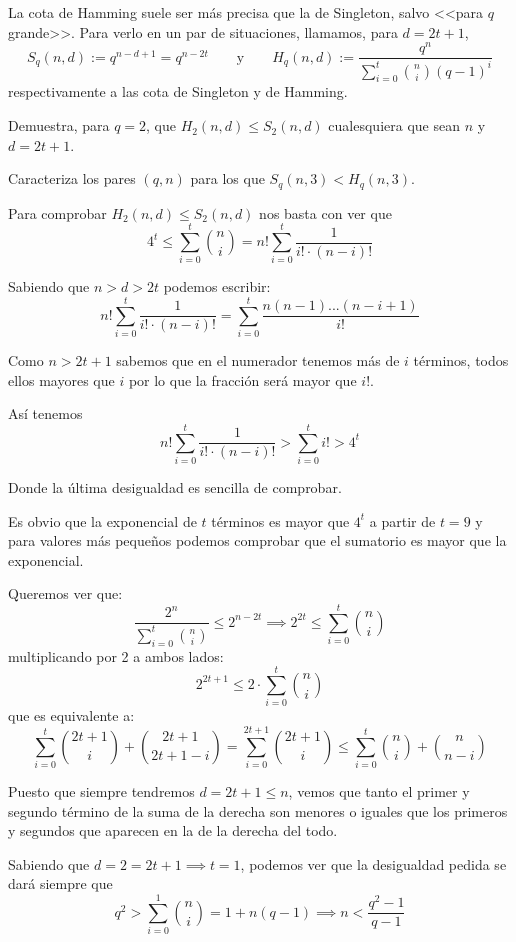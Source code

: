 \begin{problem}[10] La cota de Hamming suele ser más precisa que la de Singleton, salvo <<para $q$ grande>>. Para verlo en un par de situaciones, llamamos, para $d=2t+1$, $$S_q(n,d):=q^{n-d+1}=q^{n-2t}\qquad \text{y} \qquad H_q(n,d):=\frac{q^n}{\sum_{i=0}^t \binom{n}{i}(q-1)^i}$$ respectivamente a las cota de Singleton y de Hamming.

\ppart Demuestra, para $q=2$, que $H_2(n,d)\le S_2(n,d)$ cualesquiera que sean $n$ y $d=2t+1$.


\ppart Caracteriza los pares $(q,n)$ para los que $S_q(n,3)<H_q(n,3)$.

\solution


\spart

Para comprobar $H_2(n,d) \leq S_2(n,d)$ nos basta con ver que
\[4^{t} \leq \sum_{i=0}^t \binom{n}{i} = n! \sum_{i=0}^t\frac{1}{i!\cdot (n-i)!}\]

Sabiendo que $n>d > 2t$ podemos escribir:
\[ n! \sum_{i=0}^t\frac{1}{i!\cdot (n-i)!} =\sum_{i=0}^t\frac{n(n-1)...(n-i+1)}{i!}\]

Como $n>2t+1$ sabemos que en el numerador tenemos más de $i$ términos, todos ellos mayores que $i$ por lo que la fracción será mayor que $i!$.

Así tenemos
\[n! \sum_{i=0}^t\frac{1}{i!\cdot (n-i)!} > \sum_{i=0}^t i! > 4^t\]

Donde la última desigualdad es sencilla de comprobar.

Es obvio que la exponencial de $t$ términos es mayor que $4^t$ a partir de $t=9$ y para valores más pequeños podemos comprobar que el sumatorio es mayor que la exponencial.


Queremos ver que:
\[\frac{2^n}{\sum_{i=0}^t{n \choose i}} ≤ 2^{n-2t} \implies 2^{2t} ≤ \sum_{i=0}^t{n \choose i}\]
multiplicando por 2 a ambos lados:
\[ 2^{2t+1} ≤ 2·\sum_{i=0}^t{n \choose i}\]
que es equivalente a:
\[\sum_{i=0}^t{2t+1 \choose i} + {2t+1 \choose 2t+1-i} = \sum_{i=0}^{2t+1}{2t+1 \choose i}  ≤ \sum_{i=0}^t {n \choose i} + {n \choose n-i}\]

Puesto que siempre tendremos $d=2t+1 ≤ n$, vemos que tanto el primer y segundo término de la suma de la derecha son menores o iguales que los primeros y segundos que aparecen en la de la derecha del todo.

\spart
{}

Sabiendo que $d=2=2t+1 \implies t=1$, podemos ver que la desigualdad pedida se dará siempre que
\[q^{2} > \sum_{i=0}^1 \binom{n}{i} = 1 + n(q-1) \implies n < \frac{q^2-1}{q-1}\]

\end{problem}

